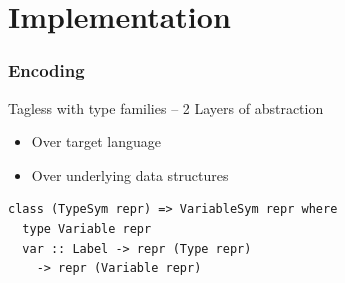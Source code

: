 \documentclass{beamer}
\begin{document}

\section[Implementation]{Implementation}


\begin{frame}[fragile]

\frametitle{Encoding}

Tagless with type families -- 2 Layers of abstraction
\begin{itemize}
  \item Over target language
  \item Over underlying data structures
\end{itemize}

\begin{lstlisting}
class (TypeSym repr) => VariableSym repr where
  type Variable repr
  var :: Label -> repr (Type repr)
    -> repr (Variable repr)
\end{lstlisting}

\end{frame}

\end{document}
